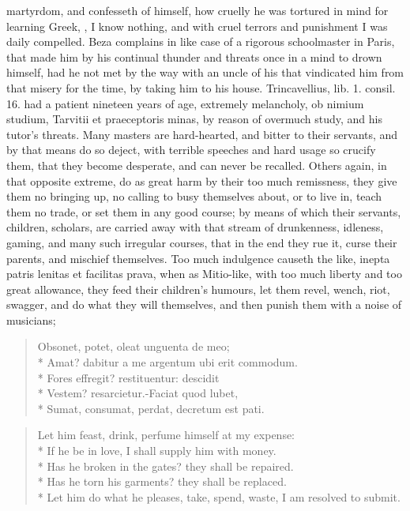 {{martyrdom, and confesseth of himself, how cruelly he was tortured in
mind for learning Greek, , I know nothing, and with
cruel terrors and punishment I was daily compelled. Beza
complains in like case of a rigorous schoolmaster in Paris, that made
him by his continual thunder and threats once in a mind to drown
himself, had he not met by the way with an uncle of his that vindicated
him from that misery for the time, by taking him to his house.
Trincavellius, lib. 1. consil. 16. had a patient nineteen years of age,
extremely melancholy, ob nimium studium, Tarvitii et praeceptoris
minas, by reason of overmuch study, and his tutor's threats. Many
masters are hard-hearted, and bitter to their servants, and by that
means do so deject, with terrible speeches and hard usage so crucify
them, that they become desperate, and can never be recalled.
Others again, in that opposite extreme, do as great harm by their too
much remissness, they give them no bringing up, no calling to busy
themselves about, or to live in, teach them no trade, or set them in
any good course; by means of which their servants, children, scholars,
are carried away with that stream of drunkenness, idleness, gaming, and
many such irregular courses, that in the end they rue it, curse their
parents, and mischief themselves. Too much indulgence causeth the like,
inepta patris lenitas et facilitas prava, when as Mitio-like,
with too much liberty and too great allowance, they feed their
children's humours, let them revel, wench, riot, swagger, and do what
they will themselves, and then punish them with a noise of musicians;
%
\begin{latin}
\begin{verse}
Obsonet, potet, oleat unguenta de meo;\\*
Amat? dabitur a me argentum ubi erit commodum.\\*
Fores effregit? restituentur: descidit\\*
Vestem? resarcietur.-Faciat quod lubet,\\*
Sumat, consumat, perdat, decretum est pati.
\end{verse}
\end{latin}
\translationrule
\begin{verse}
Let him feast, drink, perfume himself at my expense:\\*
If he be in love, I shall supply him with money.\\*
Has he broken in the gates? they shall be repaired.\\*
Has he torn his garments? they shall be replaced.\\*
Let him do what he pleases, take, spend, waste, I am resolved to submit.
\end{verse}

}}
